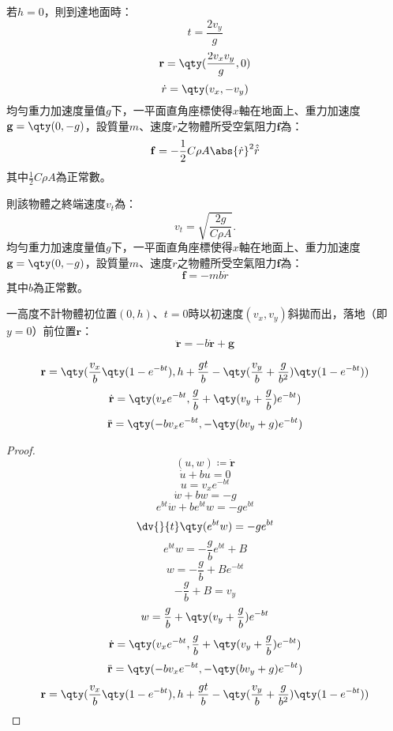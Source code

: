 \documentclass[a4paper,12pt]{article}
\begin{document}
若$h=0$，則到達地面時：
\[t=\frac{2v_y}{g}\]
\[\mathbf{r}=\qty(\frac{2v_xv_y}{g},0)\]
\[\dot{r}=\qty(v_x,-v_y)\]
均勻重力加速度量值$g$下，一平面直角座標使得$x$軸在地面上、重力加速度$\mathbf{g}=\qty(0,-g)$，設質量$m$、速度$\dot{r}$之物體所受空氣阻力$\mathbf{f}$為：
\[\mathbf{f}=-\frac{1}{2}C\rho A\abs{\dot{r}}^2\hat{\dot{r}}\]
其中$\frac{1}{2}C\rho A$為正常數。

則該物體之終端速度$v_t$為：
\[v_t=\sqrt{\frac{2g}{C\rho A}}.\]
均勻重力加速度量值$g$下，一平面直角座標使得$x$軸在地面上、重力加速度$\mathbf{g}=\qty(0,-g)$，設質量$m$、速度$\dot{r}$之物體所受空氣阻力$\mathbf{f}$為：
\[\mathbf{f}=-mb\dot{r}\]
其中$b$為正常數。

一高度不計物體初位置$(0,h)$、$t=0$時以初速度$(v_x,v_y)$斜拋而出，落地（即$y=0$）前位置$\mathbf{r}$：
\[\ddot{\mathbf{r}}=-b\dot{\mathbf{r}}+\mathbf{g}\]

\[\mathbf{r}=\qty(\frac{v_x}{b}\qty(1-e^{-bt}),h+\frac{gt}{b}-\qty(\frac{v_y}{b}+\frac{g}{b^2})\qty(1-e^{-bt}))\]
\[\dot{\mathbf{r}}=\qty(v_xe^{-bt},\frac{g}{b}+\qty(v_y+\frac{g}{b})e^{-bt})\]
\[\ddot{\mathbf{r}}=\qty(-bv_xe^{-bt},-\qty(bv_y+g)e^{-bt})\]
\begin{proof}
\[(u,w)\coloneq\dot{\mathbf{r}}\]
\[\dot{u}+bu=0\]
\[u=v_xe^{-bt}\]
\[\dot{w}+bw=-g\]
\[e^{bt}\dot{w}+be^{bt}w=-ge^{bt}\]
\[\dv{}{t}\qty(e^{bt}w)=-ge^{bt}\]
\[e^{bt}w=-\frac{g}{b}e^{bt}+B\]
\[w=-\frac{g}{b}+Be^{-bt}\]
\[-\frac{g}{b}+B=v_y\]
\[w=\frac{g}{b}+\qty(v_y+\frac{g}{b})e^{-bt}\]
\[\dot{\mathbf{r}}=\qty(v_xe^{-bt},\frac{g}{b}+\qty(v_y+\frac{g}{b})e^{-bt})\]
\[\ddot{\mathbf{r}}=\qty(-bv_xe^{-bt},-\qty(bv_y+g)e^{-bt})\]
\[\mathbf{r}=\qty(\frac{v_x}{b}\qty(1-e^{-bt}),h+\frac{gt}{b}-\qty(\frac{v_y}{b}+\frac{g}{b^2})\qty(1-e^{-bt}))\]
\end{proof}
\end{document}
